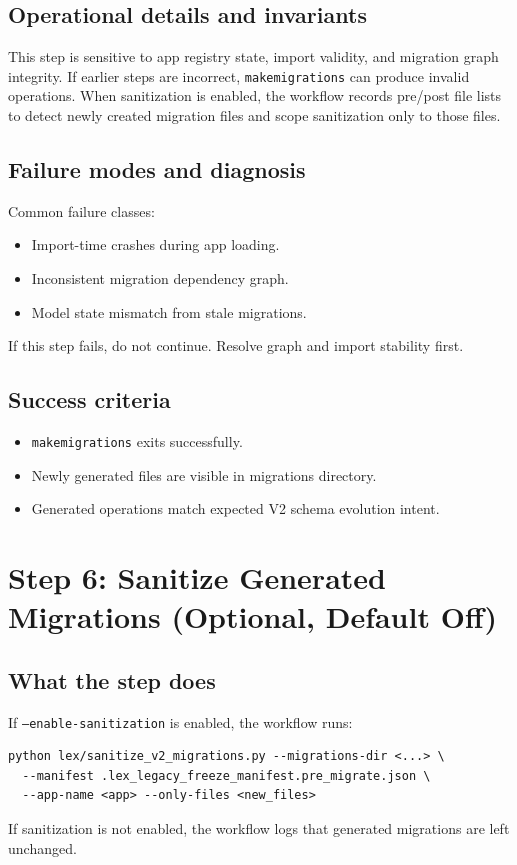 \documentclass[11pt,a4paper]{article}
\begin{document}
\subsection*{Operational details and invariants}
This step is sensitive to app registry state, import validity, and migration graph integrity.
If earlier steps are incorrect, \texttt{makemigrations} can produce invalid operations.
When sanitization is enabled, the workflow records pre/post file lists to detect newly created
migration files and scope sanitization only to those files.

\subsection*{Failure modes and diagnosis}
Common failure classes:
\begin{itemize}[leftmargin=1.5em]
  \item Import-time crashes during app loading.
  \item Inconsistent migration dependency graph.
  \item Model state mismatch from stale migrations.
\end{itemize}
If this step fails, do not continue. Resolve graph and import stability first.

\subsection*{Success criteria}
\begin{itemize}[leftmargin=1.5em]
  \item \texttt{makemigrations} exits successfully.
  \item Newly generated files are visible in migrations directory.
  \item Generated operations match expected V2 schema evolution intent.
\end{itemize}

\newpage
\section{Step 6: Sanitize Generated Migrations (Optional, Default Off)}
\subsection*{What the step does}
If \texttt{--enable-sanitization} is enabled, the workflow runs:
\begin{verbatim}
python lex/sanitize_v2_migrations.py --migrations-dir <...> \
  --manifest .lex_legacy_freeze_manifest.pre_migrate.json \
  --app-name <app> --only-files <new_files>
\end{verbatim}
If sanitization is not enabled, the workflow logs that generated migrations are left
unchanged.
\end{document}
